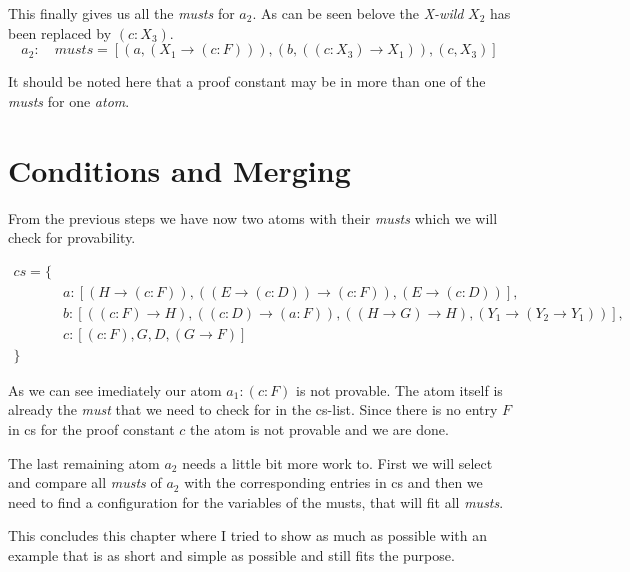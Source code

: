 This finally gives us all the \emph{musts} for $a_2$. As can be seen belove the \emph{X-wild} $X_2$ has been replaced by $(c:X_3)$.
\begin{equation}\label{eq:a2_musts}
	a_2: \quad musts = [(a, (X_1 \rightarrow (c:F))), (b, ((c:X_3) \rightarrow X_1)), (c, X_3)]
\end{equation}

It should be noted here that a proof constant may be in more than one of the \emph{musts} for one \emph{atom}. 

\section{Conditions and Merging}
From the previous steps we have now two atoms with their \emph{musts} which we will check for provability. 

\begin{equation}\label{cs}
\begin{split}
	cs = \{\\
	& a: [(H \rightarrow (c:F)), ((E \rightarrow (c:D)) \rightarrow (c:F)), (E \rightarrow (c:D))],\\
	& b: [((c:F) \rightarrow H), ((c:D) \rightarrow (a:F)), ((H \rightarrow G) \rightarrow H), (Y_1 \rightarrow (Y_2 \rightarrow Y_1))],\\
	& c: [(c:F), G, D, (G \rightarrow F)] \\
	\}
\end{split}
\end{equation}

As we can see imediately our atom $a_1: (c:F)$ is not provable. The atom itself is already the \emph{must} that we need to check for in the cs-list. Since there is no entry $F$ in cs for the proof constant $c$ the atom is not provable and we are done.

The last remaining atom $a_2$ needs a little bit more work to. First we will select and compare all \emph{musts} of $a_2$ with the corresponding entries in cs and then we need to find a configuration for the variables of the musts, that will fit all \emph{musts}.

\bigskip
This concludes this chapter where I tried to show as much as possible with an example that is as short and simple as possible and still fits the purpose. 

